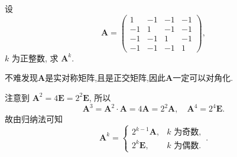 \documentclass[../../main.tex]{subfiles}%
\begin{document}
\begin{example}
设
\[
\boldsymbol{A} = \begin{pmatrix} 1 & -1 & -1 & -1 \\ -1 & 1 & -1 & -1 \\ -1 & -1 & 1 & -1 \\ -1 & -1 & -1 & 1 \end{pmatrix},
\]
\(k\) 为正整数, 求 \(\boldsymbol{A}^k\).
\end{example}
\begin{remark}
不难发现$\boldsymbol{A}$是实对称矩阵,且是正交矩阵,因此$\boldsymbol{A}$一定可以对角化.
\end{remark}
\begin{solution}
注意到 \(\boldsymbol{A}^2 = 4\boldsymbol{E} = 2^2\boldsymbol{E}\), 所以
\[
\boldsymbol{A}^3 = \boldsymbol{A}^2 \cdot \boldsymbol{A} = 4\boldsymbol{A} = 2^2\boldsymbol{A}, \quad \boldsymbol{A}^4 = 2^4\boldsymbol{E}.
\]
故由归纳法可知
\[
\boldsymbol{A}^k = \begin{cases} 2^{k - 1}\boldsymbol{A}, & k \text{ 为奇数}, \\ 2^k\boldsymbol{E}, & k \text{ 为偶数}. \end{cases}.
\]

\end{solution}
\end{document}
